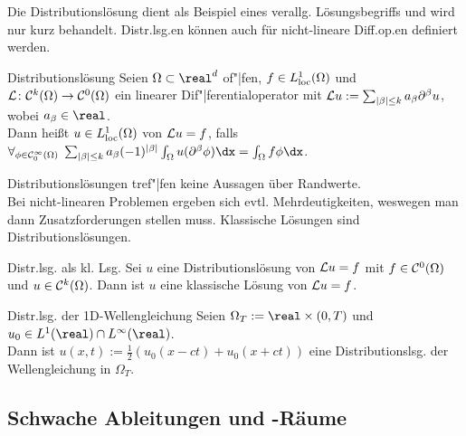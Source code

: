 \linie

\begin{Bem}
    Die Distributionslösung dient als Beispiel eines verallg. Lösungsbegriffs
    und wird nur kurz behandelt.
    Distr.lsg.en können auch für nicht-lineare Diff.op.en definiert werden.
\end{Bem}

\begin{Def}{Distributionslösung}
    Seien $\Omega \subset \real^d$ of"|fen, $f \in L^1_{\text{loc}}(\Omega)$ und
    $\mathcal{L}\colon \mathcal{C}^k(\Omega) \to \mathcal{C}^0(\Omega)$ ein linearer Dif"|ferentialoperator
    mit $\mathcal{L} u := \sum_{|\beta| \le k} a_{\beta} \partial^\beta u$, wobei $a_\beta \in \real$.\\
    Dann heißt $u \in L^1_{\text{loc}}(\Omega)$  von $\mathcal{L} u = f$, falls\\
    $\forall_{\phi \in \C^\infty_0(\Omega)}\;
    \sum_{|\beta| \le k} a_\beta (-1)^{|\beta|} \int_\Omega u (\partial^\beta \phi) \dx =
    \int_\Omega f\phi \dx$.
\end{Def}

\begin{Bem}
    Distributionslösungen tref"|fen keine Aussagen über Randwerte.\\
    Bei nicht-linearen Problemen ergeben sich evtl. Mehrdeutigkeiten, weswegen man dann
    Zusatzforderungen stellen muss.
    Klassische Lösungen sind Distributionslösungen.
\end{Bem}

\begin{Satz}{Distr.lsg. als kl. Lsg.}
    Sei $u$ eine Distributionslösung von $\mathcal{L} u = f$ mit $f \in \mathcal{C}^0(\Omega)$ und
    $u \in \mathcal{C}^k(\Omega)$.
    Dann ist $u$ eine klassische Lösung von $\mathcal{L} u = f$.
\end{Satz}

\begin{Satz}{Distr.lsg. der 1D-Wellengleichung}
   Seien $\Omega_T := \real \times (0, T)$ und $u_0 \in L^1(\real) \cap L^\infty(\real)$.\\
   Dann ist $u(x, t) := \frac{1}{2} (u_0(x - ct) + u_0(x + ct))$ eine
   Distributionslsg. der Wellengleichung in $\Omega_T$. 
\end{Satz}

\pagebreak

\subsection{%
    Schwache Ableitungen und -Räume%
}

